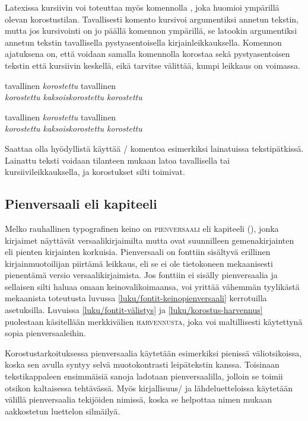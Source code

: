 Latexissa kursiivin voi toteuttaa myös komennolla , joka
huomioi ympärillä olevan korostustilan. Tavallisesti komento kursivoi
argumentiksi annetun tekstin, mutta jos kursivointi on jo päällä
komennon ympärillä, se latookin argumentiksi annetun tekstin
tavallisella pystyasentoisella kirjainleikkauksella. Komennon ajatuksena
on, että voidaan samalla komennolla korostaa sekä pystyasentoisen
tekstin että kursiivin keskellä, eikä tarvitse välittää, kumpi leikkaus
on voimassa.

\begin{koodilohkosis}
tavallinen \emph{korostettu} tavallinen \\
\emph{korostettu \emph{kaksoiskorostettu} korostettu}
\end{koodilohkosis}

\begin{tulossis}
  tavallinen \emph{korostettu} tavallinen \\
  \emph{korostettu \emph{kaksoiskorostettu} korostettu}
\end{tulossis}

Saattaa olla hyödyllistä käyttää \-/ komentoa esimerkiksi
lainatuissa tekstipätkissä. Lainattu teksti voidaan tilanteen mukaan
latoa tavallisella tai kursiivileikkauksella, ja korostukset silti
toimivat.

\subsection{Pienversaali eli kapiteeli}
\label{luku/korostus-pienversaali}

Melko rauhallinen typografinen keino on \textsc{pienversaali} eli
kapiteeli (), jonka kirjaimet näyttävät
versaalikirjaimilta mutta ovat suunnilleen gemenakirjainten eli pienten
kirjainten korkuisia. Pienversaali on fonttiin sisältyvä erillinen
kirjainmuotoilijan piirtämä leikkaus, eli se ei ole tietokoneen
mekaanisesti pienentämä versio versaalikirjaimista. Jos fonttiin ei
sisälly pienversaalia ja sellaisen silti haluaa omaan
keinovalikoimaansa, voi yrittää vähemmän tyylikästä mekaanista
toteutusta luvussa \ref{luku/fontit-keinopienversaali} kerrotuilla
asetuksilla. Luvuissa \ref{luku/fontit-välistys} ja
\ref{luku/korostus-harvennus} puolestaan käsitellään merkkivälien
{\scshape{} harvennusta}, joka voi
maltillisesti käytettynä sopia pienversaaleihin.

Korostustarkoituksessa pienversaalia käytetään esimerkiksi pienissä
väliotsikoissa, koska sen avulla syntyy selvä muotokontrasti
leipätekstin kanssa. Toisinaan tekstikappaleen ensimmäisiä sanoja
ladotaan pienversaalilla, jolloin se toimii otsikon kaltaisessa
tehtävässä. Myös kirjallisuus\-/{} ja lähdeluetteloissa käytetään
välillä pienversaalia tekijöiden nimissä, koska se helpottaa nimen
mukaan aakkostetun luettelon silmäilyä.

